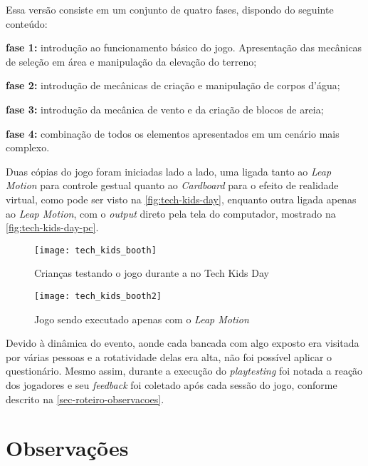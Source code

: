 Essa versão consiste em um conjunto de quatro fases, dispondo do seguinte conteúdo:

\begin{alineas}
	\item \textbf{fase 1:} introdução ao funcionamento básico do jogo. Apresentação das mecânicas de seleção em área e manipulação da elevação do terreno;
	\item \textbf{fase 2:} introdução de mecânicas de criação e manipulação de corpos d'água;
	\item \textbf{fase 3:} introdução da mecânica de vento e da criação de blocos de areia;
	\item \textbf{fase 4:} combinação de todos os elementos apresentados em um cenário mais complexo.
\end{alineas}

Duas cópias do jogo foram iniciadas lado a lado, uma ligada tanto 
ao \textit{Leap Motion} para controle gestual quanto ao \textit{Cardboard} 
para o efeito de realidade virtual, como pode ser visto 
na \autoref{fig:tech-kids-day}, enquanto outra ligada apenas ao 
\textit{Leap Motion}, com o \textit{output} direto pela tela do computador, 
mostrado na \autoref{fig:tech-kids-day-pc}.

\begin{figure}[h]
	\centering
	\caption{Crianças testando o jogo durante a no Tech Kids Day}
	\texttt{[image: tech\_kids\_booth]}
	\legend{\fonteAP}
	\label{fig:tech-kids-day}
\end{figure}

\begin{figure}[h]
	\centering
	\caption{Jogo sendo executado apenas com o \textit{Leap Motion}}
	\texttt{[image: tech\_kids\_booth2]}
	\legend{\fonteAP}
	\label{fig:tech-kids-day-pc}
\end{figure}

Devido à dinâmica do evento, aonde cada bancada com algo exposto 
era visitada por várias pessoas e a rotatividade delas era alta, 
não foi possível aplicar o questionário. Mesmo assim, durante a 
execução do \textit{playtesting} 
foi notada a reação dos 
jogadores e seu \textit{feedback} foi coletado após cada sessão do jogo, 
conforme descrito na \autoref{sec-roteiro-observacoes}.

\section{Observações}\label{sec-roteiro-observacoes}

